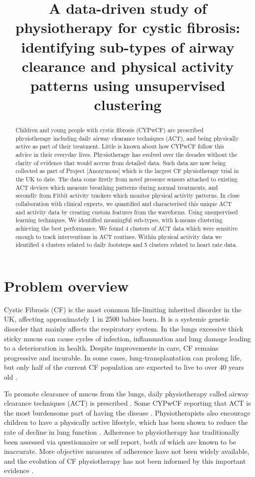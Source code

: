 \documentclass{article}
\title{A data-driven study of physiotherapy for cystic fibrosis: identifying sub-types of airway clearance and physical activity patterns using unsupervised clustering}
\begin{document}
\maketitle

\begin{abstract}
  Children and young people with cystic fibrosis (CYPwCF) are prescribed physiotherapy including daily airway clearance techniques (ACT), and being physically active as part of their treatment. Little is known about how CYPwCF follow this advice in their everyday lives. Physiotherapy has evolved over the decades without the clarity of evidence that would accrue from detailed data. Such data are now being collected as part of Project [Anonymous] which is the largest CF physiotherapy trial in the UK to date. The data come firstly from novel pressure sensors attached to existing ACT devices which measure breathing patterns during normal treatments, and secondly from Fitbit activity trackers which monitor physical activity patterns. In close collaboration with clinical experts, we quantified and characterised this unique ACT and activity data by creating custom features from the waveforms. Using unsupervised learning techniques, We identified meaningful sub-types, with k-means clustering achieving the best performance. We found 4 clusters of ACT data which were sensitive enough to track interventions in ACT routines. Within physical activity data we identified 4 clusters related to daily footsteps and 5 clusters related to heart rate data.
\end{abstract}

\section{Problem overview}

Cystic Fibrosis (CF) is the most common life-limiting inherited disorder in the UK, affecting approximately 1 in 2500 babies born. It is a systemic genetic disorder that mainly affects the respiratory system. In the lungs excessive thick sticky mucus can cause cycles of infection, inflammation and lung damage leading to a deterioration in health. Despite improvements in care, CF remains progressive and incurable. In some cases, lung-transplantation can prolong life, but only half of the current CF population are expected to live to over 40 years old \cite{Keogh2018}.  

To promote clearance of mucus from the lungs, daily physiotherapy called airway clearance techniques (ACT) is prescribed \cite{Daniels2017}. Some CYPwCF reporting that ACT is the most burdensome part of having the disease \cite{JamesLindAlliance}. Physiotherapists also encourage children to have a physically active lifestyle, which has been shown to reduce the rate of decline in lung function \cite{Williams2014}. Adherence to physiotherapy has traditionally been assessed via questionnaire or self report, both of which are known to be inaccurate. More objective measures of adherence  have not been widely available, and the evolution of CF physiotherapy has not been informed by this important evidence \cite{Modi2006}.  
\end{document}
